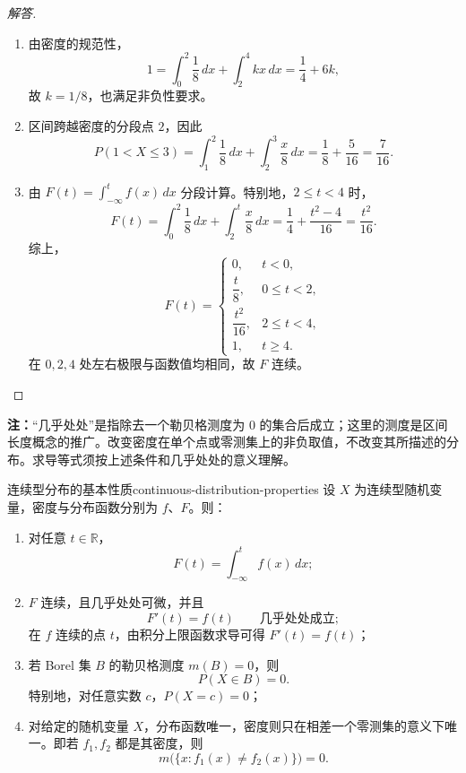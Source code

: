 \begin{proof}[解答]
\begin{enumerate}
\item 由密度的规范性，
\[
1=\int_0^2\frac18\,dx+\int_2^4kx\,dx
=\frac14+6k,
\]
故 $k=1/8$，也满足非负性要求。

\item 区间跨越密度的分段点 $2$，因此
\[
P(1<X\leq3)
=\int_1^2\frac18\,dx+\int_2^3\frac{x}{8}\,dx
=\frac18+\frac5{16}=\frac7{16}.
\]

\item 由 $F(t)=\int_{-\infty}^t f(x)\,dx$ 分段计算。特别地，$2\leq t<4$ 时，
\[
F(t)=\int_0^2\frac18\,dx+\int_2^t\frac{x}{8}\,dx
=\frac14+\frac{t^2-4}{16}=\frac{t^2}{16}.
\]
综上，
\[
F(t)=
\begin{cases}
0,&t<0,\\[0.3em]
\dfrac t8,&0\leq t<2,\\[0.5em]
\dfrac{t^2}{16},&2\leq t<4,\\[0.5em]
1,&t\geq4.
\end{cases}
\]
在 $0,2,4$ 处左右极限与函数值均相同，故 $F$ 连续。
\end{enumerate}
\end{proof}

\textbf{注：}\quad “几乎处处”是指除去一个勒贝格测度为 $0$ 的集合后成立；这里的测度是区间长度概念的推广。改变密度在单个点或零测集上的非负取值，不改变其所描述的分布。求导等式须按上述条件和几乎处处的意义理解。

\begin{proposition}{连续型分布的基本性质}{continuous-distribution-properties}
设 $X$ 为连续型随机变量，密度与分布函数分别为 $f$、$F$。则：
\begin{enumerate}
    \item 对任意 $t\in\mathbb R$，
    \[
    F(t)=\int_{-\infty}^t f(x)\,dx;
    \]
    \item $F$ 连续，且几乎处处可微，并且
    \[
    F'(t)=f(t)\qquad\text{几乎处处成立};
    \]
    在 $f$ 连续的点 $t$，由积分上限函数求导可得 $F'(t)=f(t)$；
    \item 若 Borel 集 $B$ 的勒贝格测度 $m(B)=0$，则
    \[
    P(X\in B)=0.
    \]
    特别地，对任意实数 $c$，$P(X=c)=0$；
    \item 对给定的随机变量 $X$，分布函数唯一，密度则只在相差一个零测集的意义下唯一。即若 $f_1,f_2$ 都是其密度，则
    \[
    m\bigl(\{x:f_1(x)\ne f_2(x)\}\bigr)=0.
    \]
\end{enumerate}
\end{proposition}

